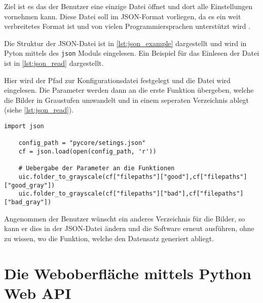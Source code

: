 Ziel ist es das der Benutzer eine einzige Datei öffnet und dort alle Einstellungen vornehmen kann. 
Diese Datei soll im \ac{JSON}-Format vorliegen, da es ein weit verbreitetes Format ist und von vielen Programmiersprachen unterstützt wird \cite{gur_diskussion_2024}.

Die Struktur der \ac{JSON}-Datei ist in \autoref{lst:json_example} dargestellt und wird in Pyton mittels des \texttt{json} Moduls eingelesen. Ein Beispiel für das Einlesen der Datei ist in \autoref{lst:json_read} dargestellt.

Hier wird der Pfad zur Konfigurationsdatei festgelegt und die Datei wird eingelesen. Die Parameter werden dann an die erste Funktion übergeben, welche die Bilder in Graustufen umwandelt und in einem seperaten Verzeichnis ablegt (siehe \autoref{lst:json_read}). 

\begin{lstlisting}[style=python, label=lst:json_read, caption={Einlesen der \ac{JSON}-Datei}]
    import json

    config_path = "pycore/setings.json"
    cf = json.load(open(config_path, 'r'))

    # Uebergabe der Parameter an die Funktionen
    uic.folder_to_grayscale(cf["filepaths"]["good"],cf["filepaths"]["good_gray"])
    uic.folder_to_grayscale(cf["filepaths"]["bad"],cf["filepaths"]["bad_gray"])

\end{lstlisting}

Angenommen der Benutzer wünscht ein anderes Verzeichnis für die Bilder, so kann er dies in der \ac{JSON}-Datei ändern und die Software erneut ausführen, ohne zu wissen, wo die Funktion, welche den Datensatz generiert abliegt.

\section{Die Weboberfläche mittels Python Web API} \label{sec:weboberflaeche}